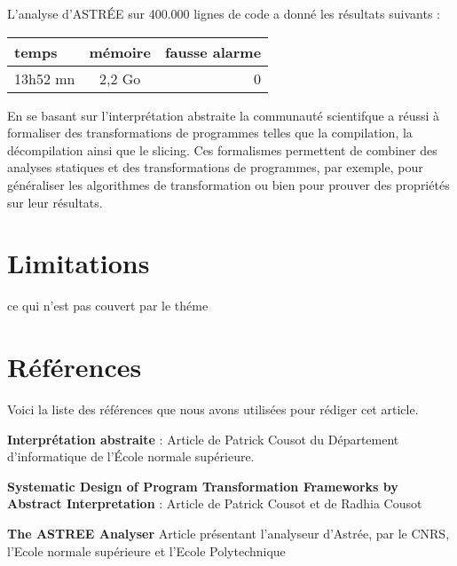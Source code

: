 \documentclass[french]{report}
\begin{document}
L'analyse d'ASTRÉE sur 400.000 lignes de code a donné les résultats suivants : \\
\begin{center}
\begin{tabular}{|l|c|r|}
  \hline
  temps & mémoire & fausse alarme \\
  \hline
  13h52 mn & 2,2 Go & 0 \\
  \hline
\end{tabular}
\end{center}

En se basant sur l'interprétation abstraite la communauté scientifque a réussi à formaliser des transformations de programmes telles que la compilation, la décompilation ainsi que le slicing. Ces formalismes permettent de combiner des analyses statiques et des transformations de programmes, par exemple, pour généraliser les algorithmes de transformation ou bien pour prouver des propriétés sur leur résultats.


\section{Limitations}

ce qui n'est pas couvert par le théme

\section{Références}
Voici la liste des références que nous avons utilisées pour rédiger cet article.
\begin{description}
    \item \textbf{Interprétation abstraite} : Article de Patrick Cousot du
    Département d’informatique de l'École normale supérieure.
    \item \textbf{Systematic Design of Program Transformation Frameworks by Abstract Interpretation} :
    Article de Patrick Cousot et de Radhia Cousot
    \item \textbf{The ASTREE Analyser} Article présentant l'analyseur d'Astrée, par le CNRS, l'Ecole normale supérieure
    et l'Ecole Polytechnique
\end{description}
\end{document}
